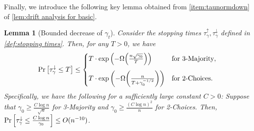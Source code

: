 \documentclass[letterpaper,11pt]{article}
\newtheorem{lemma}[theorem]{Lemma}
\newcommand{\alphanorm}{\gamma}
\newcommand{\taunormup}{\tau^{\uparrow}_\alphanorm}
\newcommand{\taunormdown}{\tau^{\downarrow}_\alphanorm}
\begin{document}
Finally, we introduce the following key lemma obtained from \cref{item:taunormdown} of \cref{lem:drift analysis for basic}. 
\begin{lemma}[Bounded decrease of $\alphanorm_t$]
\label{lem:taunormdown is large}
  Consider the stopping times $\taunormup,\taunormdown$ defined in \cref{def:stopping times}.
  Then, for any $T>0$, we have
    \begin{align*}
        \Pr\qty[\taunormdown\leq T]\le
          \begin{cases}
          T\cdot \exp\qty(-\Omega\qty(\frac{n\sqrt{\alphanorm_0}}{T})) & \text{for 3-Majority}, \\[10pt]
          T\cdot \exp\qty(-\Omega\qty(\frac{n}{T+\alphanorm_0^{-1/2}})) & \text{for 2-Choices}.
        \end{cases}
    \end{align*}
  Specifically, we have the following for a sufficiently large constant $C>0$:
  Suppose that $\alphanorm_0\geq \frac{C\log n}{\sqrt{n}}$ for 3-Majority and $\alphanorm_0\geq \frac{(C\log n)^2}{n}$ for 2-Choices. Then, $\Pr\qty[\taunormdown\leq \frac{C\log n}{\alphanorm_0}]\leq O(n^{-10})$.
\end{lemma}
\end{document}
